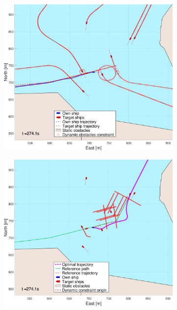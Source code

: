 \begin{figure}[ht!]\ContinuedFloat
    \begin{subfigure}[b]{0.494\textwidth}
        \centering
        \includegraphics[width=\textwidth]{Images/NewFigures/Trheimfjord/_Simple_0fig1_time=275}
        \subcaption{}
    \end{subfigure}
    \hfill
    \begin{subfigure}[b]{0.494\textwidth}
        \centering
        \includegraphics[width=\textwidth]{Images/NewFigures/Trheimfjord/_Simple_0fig999_time=275}

\end{subfigure}
\end{figure}
